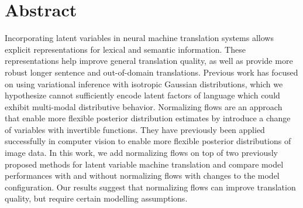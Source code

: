 
\chapter{Abstract}

Incorporating latent variables in neural machine translation systems allows explicit representations for lexical and semantic information. These representations help improve general translation quality, as well as provide more robust longer sentence and out-of-domain translations. Previous work has focused on using variational inference with isotropic Gaussian distributions, which we hypothesize cannot sufficiently encode latent factors of language which could exhibit multi-modal distributive behavior. Normalizing flows are an approach that enable more flexible posterior distribution estimates by introduce a change of variables with invertible functions. They have previously been applied successfully in computer vision to enable more flexible posterior distributions of image data. In this work, we add normalizing flows on top of two previously proposed methods for latent variable machine translation and compare model performances with and without normalizing flows with changes to the model configuration. Our results suggest that normalizing flows can improve translation quality, but require certain modelling assumptions.  %


